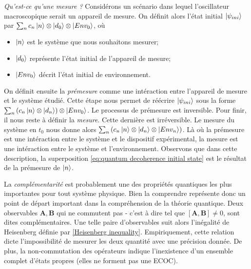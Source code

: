 \documentclass[11pt,oneside,a4paper]{article}
\begin{document}
\emph{Qu'est-ce qu'une mesure ?} Considérons un scénario dans lequel l'oscillateur macroscopique serait un appareil de mesure. On définit alors l'état initial $\ket{\psi_{ini}}$ par $\sum_n c_n\ket{n}\otimes\ket{d_0}\otimes\ket{Env_0}$, où 
\begin{itemize}
  \item[\ding{108}] $\ket{n}$ est le système que nous souhaitons mesurer;
  \item[\ding{108}] $\ket{d_0}$ représente l'état initial de l'appareil de mesure;
  \item[\ding{108}] $\ket{Env_0}$ décrit l'état initial de environnement.
\end{itemize}
On définit ensuite la \emph{prémesure} comme une intéraction entre l'appareil de mesure et le système étudié. Cette étape nous permet de réécrire $\ket{\psi_{ini}}$ sous la forme $\sum_n  \left(c_n\ket{n}\otimes\ket{d_n}\right)\otimes\ket{Env_0}$. Le processus de prémesure est inversible. Pour finir, il nous reste à définir la \emph{mesure}. Cette dernière est irréversible. Le mesure du système en $t_0$ nous donne alors $\sum_n \left(c_n\ket{n}\otimes\ket{d_n}\otimes\ket{Env_n}\right)$. Là où la prémesure est une intéraction entre le système et le dispositif expérimental, la mesure est une intéraction entre le système et l'environnement. Observons que dans cette description, la superposition \eqref{eq:quantum decoherence initial state} est le résultat de la prémesure de $\ket{n}$.

La \emph{complémentarité} est probablement une des propriétés quantiques les plus importantes pour tout système physique. Bien la comprendre représente donc un point de départ important dans la compréhension de la théorie quantique. Deux observables $\bm{A},\bm{B}$ qui ne commutent pas - c'est à dire tel que $\left[\bm{A},\bm{B}\right]\neq 0$, sont dites complémentaires. Une telle paire d'observables suit alors l'inégalité de Heisenberg définie par \eqref{Heisenberg inequality}. Empiriquement, cette relation dicte l'impossibilité de mesurer les deux quantité avec une précision donnée. De plus, la non-commutation des opérateurs indique l'inexistence d'un ensemble complet d'états propres (elles ne forment pas une ECOC).\\
\end{document}
